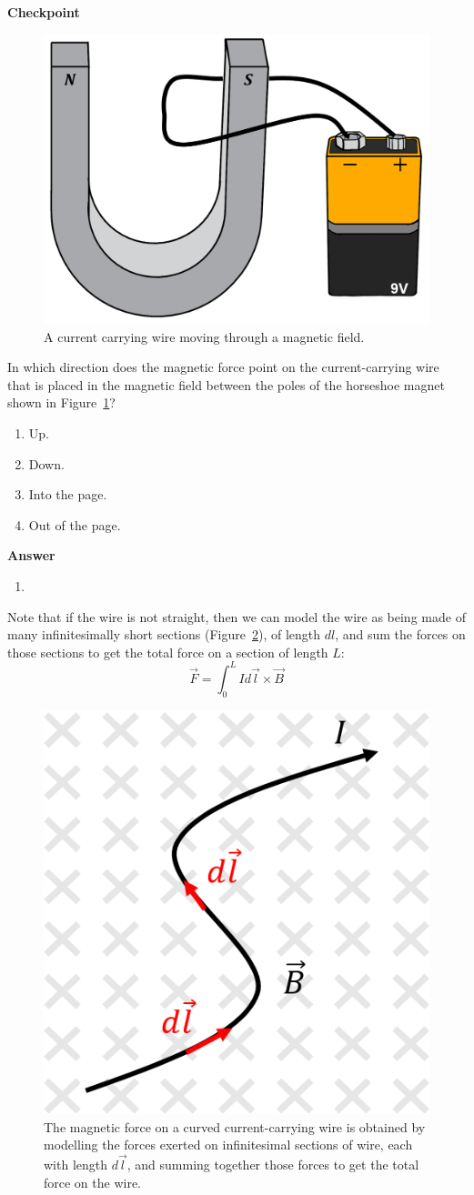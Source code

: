 \begin{framed}
\textbf{Checkpoint}\\
\begin{figure}[!htbp]
\centering
\includegraphics[width=0.35\linewidth]{files/horseshoemagnet-90d031fef6cc196c5bd44a9829c50a69.png}
\caption[]{A current carrying wire moving through a magnetic field.}
\label{fig:magneticforce:horseshoemagnet}
\end{figure}

In which direction does the magnetic force point on the current-carrying wire that is placed in the magnetic field between the poles of the horseshoe magnet shown in Figure~\ref{fig:magneticforce:horseshoemagnet}?

\begin{enumerate}
\item Up.
\item Down.
\item Into the page.
\item Out of the page.
\end{enumerate}

\begin{framed}
\textbf{Answer}\\
\begin{enumerate}
\item
\end{enumerate}
\end{framed}
\end{framed}

Note that if the wire is not straight, then we can model the wire as being made of many infinitesimally short sections (Figure~\ref{fig:magneticforce:bentwire}), of length $dl$, and sum the forces on those sections to get the total force on a section of length $L$:
\begin{equation}
\vec F = \int_0^L I d\vec l \times \vec B
\end{equation}
\begin{figure}[!htbp]
\centering
\includegraphics[width=0.3\linewidth]{files/bentwire-55e9968fb877a8a926c6dd1b897ed8e1.png}
\caption[]{The magnetic force on a curved current-carrying wire is obtained by modelling the forces exerted on infinitesimal sections of wire, each with length $d\vec l$, and summing together those forces to get the total force on the wire.}
\label{fig:magneticforce:bentwire}
\end{figure}

